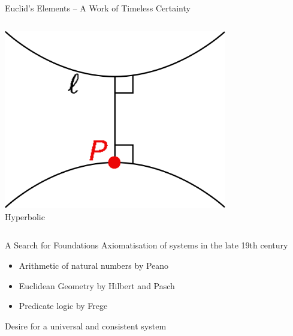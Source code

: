 \documentclass{beamer}
\begin{document}
\begin{frame}{Euclid's Elements -- A Work of Timeless Certainty}
{\begin{alertbox}
\begin{columns}[T,onlytextwidth]
\begin{column}{.33\textwidth}
		\centering\includegraphics[width=0.73\textwidth]{img/geo_hyp.png}\\Hyperbolic
	 \end{column}
	\end{columns}
	\end{alertbox}
	}
\end{frame}
\begin{frame}{A Search for Foundations}
Axiomatisation of systems in the late 19th century
	\pause
	\begin{itemize}[<+->]
		\item Arithmetic of natural numbers by Peano
		\item Euclidean Geometry by Hilbert and Pasch
		\item Predicate logic by Frege
	\end{itemize}
	\pause[\thebeamerpauses]
	\centering \alert{Desire for a universal and consistent system}
\end{frame}
\end{document}
